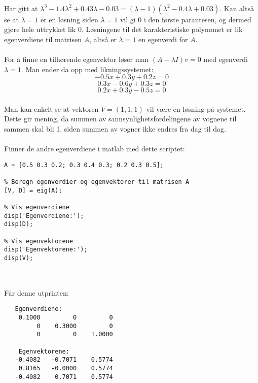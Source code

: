 \\ 
Har gitt at $\lambda^3-1.4\lambda^2+0.43\lambda-0.03 = (\lambda-1)(\lambda^2-0.4\lambda+0.03)$. Kan altså se at $\lambda = 1$ er en løsning siden $\lambda = 1$ vil gi 0 i den første parantesen, og dermed gjøre hele uttrykket lik 0. Løsningene til det karakteristiske polynomet er lik egenverdiene til matrisen $A$, altså er $\lambda = 1$ en egenverdi for $A$. \\\\
For å finne en tilhørende egenvektor løser man $(A-\lambda I)v=0$ med egenverdi $\lambda=1$. Man ender da opp med likningssystemet:
    \begin{equation} \nonumber
        -0.5x + 0.3y+0.2z=0
    \end{equation}\begin{equation}\nonumber
        0.3x-0.6y+0.3z=0
    \end{equation}\begin{equation}\nonumber
        0.2x+0.3y-0.5z=0
    \end{equation}
\\ Man kan enkelt se at vektoren $V=(1, 1, 1)$ vil være en løsning på systemet. Dette gir mening, da summen av sannsynlighetsfordelingene av vognene til sammen skal bli 1, siden summen av vogner ikke endres fra dag til dag.
\\\\
Finner de andre egenverdiene i matlab med dette scriptet:
\\
\begin{lstlisting}[style=Matlab-editor]
% Definer matrisen A
A = [0.5 0.3 0.2; 0.3 0.4 0.3; 0.2 0.3 0.5];

% Beregn egenverdier og egenvektorer til matrisen A
[V, D] = eig(A);

% Vis egenverdiene
disp('Egenverdiene:');
disp(D);

% Vis egenvektorene
disp('Egenvektorene:');
disp(V);


\end{lstlisting}\\
\vspace{0.1in}
Får denne utprinten:
\begin{lstlisting}
   Egenverdiene:
    0.1000         0         0
         0    0.3000         0
         0         0    1.0000

    Egenvektorene:
   -0.4082   -0.7071    0.5774
    0.8165   -0.0000    0.5774
   -0.4082    0.7071    0.5774
\end{lstlisting}\\

